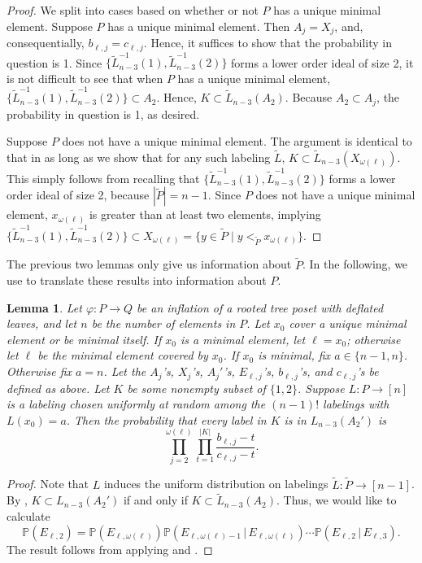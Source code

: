 \documentclass[11pt]{amsart}
\newtheorem{lemma}[thm]{Lemma}
\theoremstyle{definition}
\newcommand{\Prob}{\mathbb{P}}
\newcommand{\inverse}{^{-1}}
\newcommand{\vphi}{\varphi}
\begin{document}
\begin{proof}
	We split into cases based on whether or not $ P $ has a unique minimal element. Suppose $ P $ has a unique minimal element. Then $ A_j=X_j $, and, consequentially, $ b_{\ell,j}=c_{\ell,j} $. Hence, it suffices to show that the probability in question is 1. Since $ \{\tilde{L}_{n-3}\inverse(1),\tilde{L}_{n-3}\inverse(2)\} $ forms a lower order ideal of size 2, it is not difficult to see that when $ P $ has a unique minimal element, $ \{\tilde{L}_{n-3}\inverse(1),\tilde{L}_{n-3}\inverse(2)\}\subset A_2 $. Hence, $ K\subset\tilde{L}_{n-3}(A_2) $. Because $ A_2\subset A_j $, the probability in question is 1, as desired. 
	
	Suppose $ P $ does not have a unique minimal element. The argument is identical to that in  as long as we show that for any such labeling $ \tilde{L} $, $ K\subset\tilde{L}_{n-3}(X_{\omega(\ell)}) $. This simply follows from recalling that $ \{\tilde{L}_{n-3}\inverse(1),\tilde{L}_{n-3}\inverse(2)\} $ forms a lower order ideal of size 2, because $ |\tilde{P}|=n-1 $. Since $ P $ does not have a unique minimal element, $ x_{\omega(\ell)} $ is greater than at least two elements, implying $ \{\tilde{L}_{n-3}\inverse(1),\tilde{L}_{n-3}\inverse(2)\}\subset X_{\omega(\ell)}=\{y\in\tilde{P}\;|\;y<_{\tilde{P}}x_{\omega(\ell)}\} $. 
\end{proof}
The previous two lemmas only give us information about $ \tilde{P} $. In the following, we use  to translate these results into information about $ P $. 
\begin{lemma}\label{helper}
	Let $ \vphi:P\to Q $ be an inflation of a rooted tree poset with deflated leaves, and let $ n $ be the number of elements in $ P $. Let $ x_0 $ cover a unique minimal element or be minimal itself. If $ x_0 $ is a minimal element, let $ \ell=x_0 $; otherwise let $ \ell $ be the minimal element covered by $ x_0 $. If $ x_0 $ is minimal, fix $ a\in\{n-1,n\} $. Otherwise fix $ a=n $. Let the $ A_j $'s, $ X_j $'s, $ A_j' $'s, $ E_{\ell,j} $'s, $ b_{\ell,j} $'s, and $ c_{\ell,j} $'s be defined as above. Let $ K$ be some nonempty subset of $\{1,2\} $. Suppose $ L:P\to[n] $ is a labeling chosen uniformly at random among the $ (n-1)! $ labelings with $ L(x_0)=a $. Then the probability that every label in $ K $ is in $ L_{n-3}(A_2') $ is \[\prod_{j=2}^{\omega(\ell)}\prod_{t=1}^{|K|}\frac{b_{\ell,j}-t}{c_{\ell,j}-t}.\]
\end{lemma}
\begin{proof}
	Note that $ L $ induces the uniform distribution on labelings $ \tilde{L}:\tilde{P}\to[n-1] $. By , $ K\subset L_{n-3}(A_2') $ if and only if $ K\subset \tilde{L}_{n-3}(A_2) $. Thus, we would like to calculate \[\Prob(E_{\ell,2})=\Prob(E_{\ell,\omega(\ell)})\Prob(E_{\ell,\omega(\ell)-1}\,|\,E_{\ell,\omega(\ell)})\cdots\Prob(E_{\ell,2}\,|\,E_{\ell,3}).\] The result follows from applying  and .
\end{proof}
\end{document}
